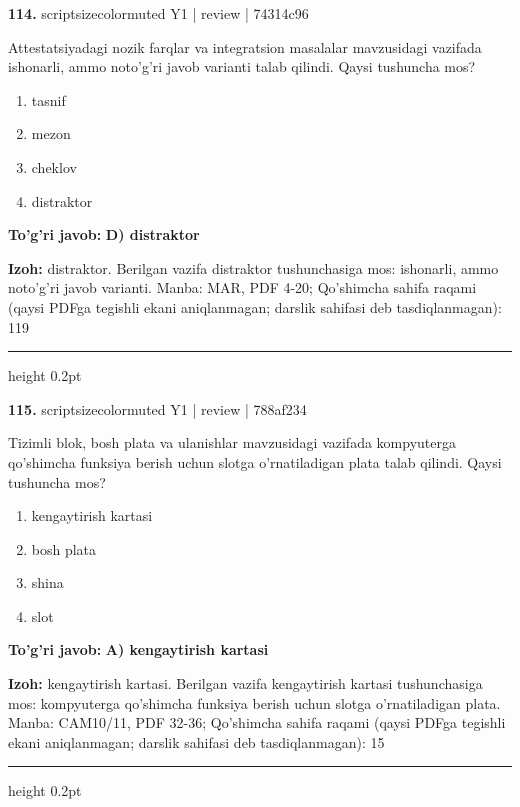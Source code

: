 \documentclass[10pt,a4paper]{article}
\begin{document}
{\bfseries\sffamily\color{ink} 114.} {scriptsizecolor{muted} Y1 | review | 74314c96}
\par
Attestatsiyadagi nozik farqlar va integratsion masalalar mavzusidagi vazifada ishonarli, ammo noto'g'ri javob varianti talab qilindi. Qaysi tushuncha mos?
\begin{enumerate}[label=\Alph*),leftmargin=9mm]
\item tasnif
\item mezon
\item cheklov
\item distraktor
\end{enumerate}
\begin{tcolorbox}[enhanced,breakable,colback=teal!4,colframe=teal!60!black,boxrule=0.45pt,arc=1.2mm,left=2.7mm,right=2.7mm,top=1.8mm,bottom=1.8mm,before skip=2mm,after skip=2mm]
{\bfseries\sffamily\color{teal}To'g'ri javob:} \textbf{D) distraktor}
\par\smallskip
{\bfseries Izoh:} distraktor. Berilgan vazifa distraktor tushunchasiga mos: ishonarli, ammo noto'g'ri javob varianti. Manba: MAR, PDF 4-20; Qo'shimcha sahifa raqami (qaysi PDFga tegishli ekani aniqlanmagan; darslik sahifasi deb tasdiqlanmagan): 119
\end{tcolorbox}
\vspace{2mm}\hrule height 0.2pt\vspace{3mm}

{\bfseries\sffamily\color{ink} 115.} {scriptsizecolor{muted} Y1 | review | 788af234}
\par
Tizimli blok, bosh plata va ulanishlar mavzusidagi vazifada kompyuterga qo'shimcha funksiya berish uchun slotga o'rnatiladigan plata talab qilindi. Qaysi tushuncha mos?
\begin{enumerate}[label=\Alph*),leftmargin=9mm]
\item kengaytirish kartasi
\item bosh plata
\item shina
\item slot
\end{enumerate}
\begin{tcolorbox}[enhanced,breakable,colback=teal!4,colframe=teal!60!black,boxrule=0.45pt,arc=1.2mm,left=2.7mm,right=2.7mm,top=1.8mm,bottom=1.8mm,before skip=2mm,after skip=2mm]
{\bfseries\sffamily\color{teal}To'g'ri javob:} \textbf{A) kengaytirish kartasi}
\par\smallskip
{\bfseries Izoh:} kengaytirish kartasi. Berilgan vazifa kengaytirish kartasi tushunchasiga mos: kompyuterga qo'shimcha funksiya berish uchun slotga o'rnatiladigan plata. Manba: CAM10/11, PDF 32-36; Qo'shimcha sahifa raqami (qaysi PDFga tegishli ekani aniqlanmagan; darslik sahifasi deb tasdiqlanmagan): 15
\end{tcolorbox}
\vspace{2mm}\hrule height 0.2pt\vspace{3mm}
\end{document}
